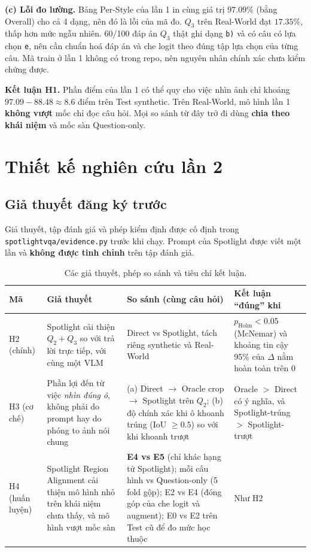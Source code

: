 \documentclass[12pt]{ai_conquer2026}
\begin{document}
\textbf{(c) Lỗi đo lường.} Bảng Per-Style của lần 1 in cùng giá trị $97.09\%$ (bằng Overall) cho cả 4 dạng, nên đó là lỗi của mã đo. $Q_3$ trên Real-World đạt $17.35\%$, thấp hơn mức ngẫu nhiên. 60/100 đáp án $Q_3$ thật ghi dạng \texttt{b)} và có câu có lựa chọn \texttt{e}, nên cần chuẩn hoá đáp án và che logit theo đúng tập lựa chọn của từng câu. Mã train ở lần 1 không có trong repo, nên nguyên nhân chính xác chưa kiểm chứng được.

\textbf{Kết luận H1.} Phần điểm của lần 1 có thể quy cho việc nhìn ảnh chỉ khoảng $97.09 - 88.48 \approx 8.6$ điểm trên Test synthetic. Trên Real-World, mô hình lần 1 \textbf{không vượt} mốc chỉ đọc câu hỏi. Mọi so sánh từ đây trở đi dùng \textbf{chia theo khái niệm} và mốc sàn Question-only.

\section{Thiết kế nghiên cứu lần 2}

\subsection{Giả thuyết đăng ký trước}

Giả thuyết, tập đánh giá và phép kiểm định được cố định trong \texttt{spotlightvqa/evidence.py} trước khi chạy. Prompt của Spotlight được viết một lần và \textbf{không được tinh chỉnh} trên tập đánh giá.

\begin{table}[h!]
\centering
\small
\caption{Các giả thuyết, phép so sánh và tiêu chí kết luận.}
\label{tab:hyp}
\begin{tabularx}{\textwidth}{|l|Y|Y|Y|}
\hline
\textbf{Mã} & \textbf{Giả thuyết} & \textbf{So sánh (cùng câu hỏi)} & \textbf{Kết luận ``đúng'' khi} \\ \hline
H2 (chính) & Spotlight cải thiện $Q_2{+}Q_3$ so với trả lời trực tiếp, với cùng một VLM & Direct vs Spotlight, tách riêng synthetic và Real-World & $p_{\text{Holm}} < 0.05$ (McNemar) và khoảng tin cậy 95\% của $\Delta$ nằm hoàn toàn trên 0 \\ \hline
H3 (cơ chế) & Phần lợi đến từ việc \emph{nhìn đúng ô}, không phải do prompt hay do phóng to ảnh nói chung & (a) Direct $\rightarrow$ Oracle crop $\rightarrow$ Spotlight trên $Q_2$; (b) độ chính xác khi ô khoanh trúng (IoU $\ge 0.5$) so với khi khoanh trượt & Oracle $>$ Direct có ý nghĩa, và Spotlight-trúng $>$ Spotlight-trượt \\ \hline
H4 (huấn luyện) & Spotlight Region Alignment cải thiện mô hình nhỏ trên khái niệm chưa thấy, và mô hình vượt mốc sàn & \textbf{E4 vs E5} (chỉ khác hạng tử Spotlight); mỗi cấu hình vs Question-only (5 fold gộp); E2 vs E4 (đóng góp của che logit và augment); E0 vs E2 trên Test cũ để đo mức học thuộc & Như H2 \\ \hline
\end{tabularx}
\end{table}
\end{document}
